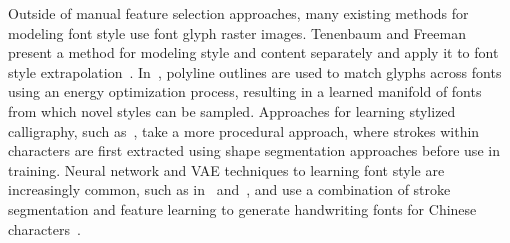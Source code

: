 Outside of manual feature selection approaches, many existing methods for modeling font style use font glyph raster images.
Tenenbaum and Freeman present a method for modeling style and content separately and apply it to font style extrapolation~\cite{tenenbaum1997separating}.
In~\cite{campbell2014learning}, polyline outlines are used to match glyphs across fonts using an energy optimization process, resulting in a learned manifold of fonts from which novel styles can be sampled.
Approaches for learning stylized calligraphy, such as~\cite{xu2005automatic}, take a more procedural approach, where strokes within characters are first extracted using shape segmentation approaches before use in training.
Neural network and VAE techniques to learning font style are increasingly common, such as in~\cite{upchurch2016z} and~\cite{wang2015deepfont}, and \citeauthor{lian2016automatic} use a combination of stroke segmentation and feature learning to generate handwriting fonts for Chinese characters~\cite{lian2016automatic}.
